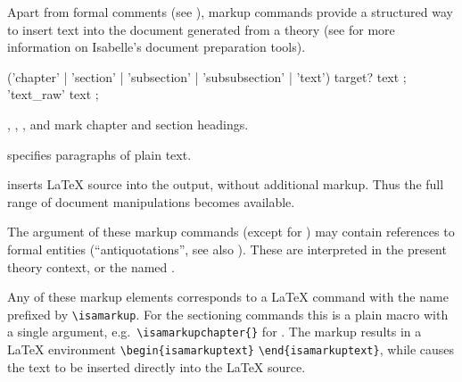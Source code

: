 \begin{isabellebody}
\begin{isamarkuptext}
  Apart from formal comments (see ), markup
  commands provide a structured way to insert text into the document
  generated from a theory (see \cite{isabelle-sys} for more
  information on Isabelle's document preparation tools).

  \begin{rail}
    ('chapter' | 'section' | 'subsection' | 'subsubsection' | 'text') target? text
    ;
    'text\_raw' text
    ;
  \end{rail}

  \begin{descr}

  \item [\mbox{\isa{\isacommand{chapter}}}, \mbox{\isa{\isacommand{section}}}, \mbox{\isa{\isacommand{subsection}}}, and \mbox{\isa{\isacommand{subsubsection}}}] mark chapter and
  section headings.

  \item [\mbox{\isa{\isacommand{text}}}] specifies paragraphs of plain text.

  \item [\mbox{\isa{\isacommand{text{\isacharunderscore}raw}}}] inserts {\LaTeX} source into the
  output, without additional markup.  Thus the full range of document
  manipulations becomes available.

  \end{descr}

  The  argument of these markup commands (except for
  \mbox{}) may contain references to formal entities
  (``antiquotations'', see also ).  These are
  interpreted in the present theory context, or the named .

  Any of these markup elements corresponds to a {\LaTeX} command with
  the name prefixed by \verb|\isamarkup|.  For the sectioning
  commands this is a plain macro with a single argument, e.g.\
  \verb|\isamarkupchapter{|\isa{{\isachardoublequote}{\isasymdots}{\isachardoublequote}}\verb|}| for
  \mbox{\isa{\isacommand{chapter}}}.  The \mbox{\isa{\isacommand{text}}} markup results in a
  {\LaTeX} environment \verb|\begin{isamarkuptext}| \isa{{\isachardoublequote}{\isasymdots}{\isachardoublequote}} \verb|\end{isamarkuptext}|, while \mbox{}
  causes the text to be inserted directly into the {\LaTeX} source.


\end{isamarkuptext}
\end{isabellebody}
